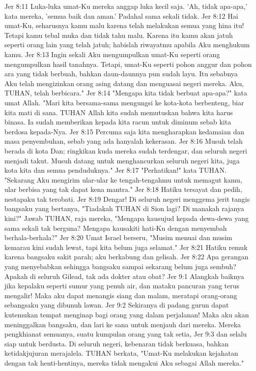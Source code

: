 Jer 8:11  Luka-luka umat-Ku mereka anggap luka kecil saja. 'Ah, tidak apa-apa,' kata mereka, 'semua baik dan aman.' Padahal sama sekali tidak.
Jer 8:12  Hai umat-Ku, seharusnya kamu malu karena telah melakukan semua yang hina itu! Tetapi kamu tebal muka dan tidak tahu malu. Karena itu kamu akan jatuh seperti orang lain yang telah jatuh; habislah riwayatmu apabila Aku menghukum kamu.
Jer 8:13  Ingin sekali Aku mengumpulkan umat-Ku seperti orang mengumpulkan hasil tanahnya. Tetapi, umat-Ku seperti pohon anggur dan pohon ara yang tidak berbuah, bahkan daun-daunnya pun sudah layu. Itu sebabnya Aku telah mengizinkan orang asing datang dan menguasai negeri mereka. Aku, TUHAN, telah berbicara."
Jer 8:14  "Mengapa kita tidak berbuat apa-apa?" kata umat Allah. "Mari kita bersama-sama mengungsi ke kota-kota berbenteng, biar kita mati di sana. TUHAN Allah kita sudah memutuskan bahwa kita harus binasa. Ia sudah memberikan kepada kita racun untuk diminum sebab kita berdosa kepada-Nya.
Jer 8:15  Percuma saja kita mengharapkan kedamaian dan masa penyembuhan, sebab yang ada hanyalah kekerasan.
Jer 8:16  Musuh telah berada di kota Dan; ringkikan kuda mereka sudah terdengar, dan seluruh negeri menjadi takut. Musuh datang untuk menghancurkan seluruh negeri kita, juga kota kita dan semua penduduknya."
Jer 8:17  "Perhatikan!" kata TUHAN. "Sekarang Aku mengirim ular-ular ke tengah-tengahmu untuk memagut kamu, ular berbisa yang tak dapat kena mantra."
Jer 8:18  Hatiku tersayat dan pedih, nestapaku tak terobati.
Jer 8:19  Dengar! Di seluruh negeri menggema jerit tangis bangsaku yang bertanya, "Tiadakah TUHAN di Sion lagi? Di manakah rajanya kini?" Jawab TUHAN, raja mereka, "Mengapa kausujud kepada dewa-dewa yang sama sekali tak berguna? Mengapa kausakiti hati-Ku dengan menyembah berhala-berhala?"
Jer 8:20  Umat Israel berseru, "Musim menuai dan musim kemarau kini sudah lewat, tapi kita belum juga selamat."
Jer 8:21  Hatiku remuk karena bangsaku sakit parah; aku berkabung dan gelisah.
Jer 8:22  Apa gerangan yang menyebabkan sehingga bangsaku sampai sekarang belum juga sembuh? Apakah di seluruh Gilead, tak ada dokter atau obat?
Jer 9:1  Alangkah baiknya jika kepalaku seperti sumur yang penuh air, dan mataku pancuran yang terus mengalir! Maka aku dapat menangis siang dan malam, meratapi orang-orang sebangsaku yang dibunuh lawan.
Jer 9:2  Sekiranya di padang gurun dapat kutemukan tempat menginap bagi orang yang dalam perjalanan! Maka aku akan meninggalkan bangsaku, dan lari ke sana untuk menjauh dari mereka. Mereka pengkhianat semuanya, suatu kumpulan orang yang tak setia,
Jer 9:3  dan selalu siap untuk berdusta. Di seluruh negeri, kebenaran tidak berkuasa, bahkan ketidakjujuran merajalela. TUHAN berkata, "Umat-Ku melakukan kejahatan dengan tak henti-hentinya, mereka tidak mengakui Aku sebagai Allah mereka."
